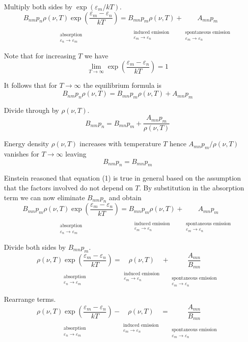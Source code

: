 \documentclass[12pt]{article}
\newcommand\BNM{B_{nm}} %
\newcommand\BMN{B_{mn}} %
\newcommand\AMN{A_{mn}} %
\newcommand\RHO{\rho(\nu,T)}
\newcommand\ABSORPTION{\substack{\phantom{0}\\ \text{absorption}\\ \varepsilon_n\rightarrow\varepsilon_m}}
\newcommand\INDUCED{\substack{\phantom{0}\\ \text{induced emission}\\ \varepsilon_m\rightarrow\varepsilon_n}}
\newcommand\SPONTANEOUS{\substack{\phantom{0}\\ \text{spontaneous emission}\\ \varepsilon_m\rightarrow\varepsilon_n}}
\begin{document}
\noindent
Multiply both sides by $\exp(\varepsilon_m/kT)$.
\begin{equation*}
\underset{\ABSORPTION}{\BNM p_n \RHO\exp\left(\frac{\varepsilon_m-\varepsilon_n}{kT}\right)}
=\underset{\INDUCED}{\BMN p_m \RHO}
+\underset{\SPONTANEOUS}{\AMN p_m}
\end{equation*}

\noindent
Note that for increasing $T$ we have
\begin{equation*}
\lim_{T\rightarrow\infty}\exp\left(\frac{\varepsilon_m-\varepsilon_n}{kT}\right)=1
\end{equation*}

\noindent
It follows that for $T\rightarrow\infty$ the equilibrium formula is
\begin{equation*}
\BNM p_n \RHO
=\BMN p_m \RHO
+\AMN p_m
\end{equation*}

\noindent
Divide through by $\RHO$.
\begin{equation*}
\BNM p_n=\BMN p_m+\frac{\AMN p_m}{\RHO}
\end{equation*}

\noindent
Energy density $\RHO$ increases with temperature $T$
hence $\AMN p_m/\RHO$ vanishes for $T\rightarrow\infty$ leaving
\begin{equation*}
\BNM p_n=\BMN p_m
\tag{1}
\end{equation*}

\noindent
Einstein reasoned that equation (1) is true in general based on the assumption that
the factors involved do not depend on $T$.
By substitution in the absorption term we can now eliminate $\BNM p_n$ and obtain
\begin{equation*}
\underset{\ABSORPTION}{\BMN p_m \RHO\exp\left(\frac{\varepsilon_m-\varepsilon_n}{kT}\right)}
=\underset{\INDUCED}{\BMN p_m \RHO}
+\underset{\SPONTANEOUS}{\AMN p_m}
\end{equation*}

\noindent
Divide both sides by $\BMN p_m$.
\begin{equation*}
\underset{\ABSORPTION}{\RHO\exp\left(\frac{\varepsilon_m-\varepsilon_n}{kT}\right)}
=\underset{\INDUCED}{\RHO}+\underset{\SPONTANEOUS}{\frac{\AMN}{\BMN}}
\end{equation*}

\noindent
Rearrange terms.
\begin{equation*}
\underset{\ABSORPTION}{\RHO\exp\left(\frac{\varepsilon_m-\varepsilon_n}{kT}\right)}
-\underset{\INDUCED}{\RHO}=\underset{\SPONTANEOUS}{\frac{\AMN}{\BMN}}
\end{equation*}
\end{document}

